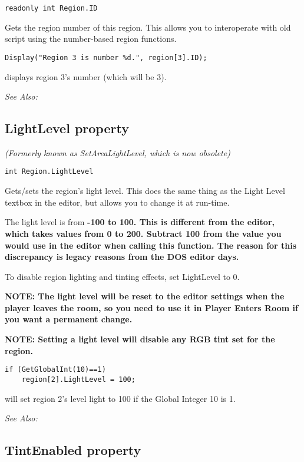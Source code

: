 \begin{verbatim}
readonly int Region.ID
\end{verbatim}
Gets the region number of this region. This allows you to interoperate with old
script using the number-based region functions.

\begin{verbatim}
Display("Region 3 is number %d.", region[3].ID);
\end{verbatim}
displays region 3's number (which will be 3).

\it{See Also:} 


\subsection{LightLevel property}\label{Region.LightLevel}%

\it{(Formerly known as SetAreaLightLevel, which is now obsolete)}

\begin{verbatim}
int Region.LightLevel
\end{verbatim}
Gets/sets the region's light level. This does the same thing as the Light Level
textbox in the editor, but allows you to change it at run-time.

The light level is from \bf{-100 to 100}. This is different from the editor, which
takes values from 0 to 200.
Subtract 100 from the value you would use in the editor when calling this function.
The reason for this discrepancy is legacy reasons from the DOS editor days.

To disable region lighting and tinting effects, set LightLevel to 0.

\bf{NOTE}: The light level will be reset to the editor settings when the player leaves the
room, so you need to use it in Player Enters Room if you want a permanent
change.

\bf{NOTE}: Setting a light level will disable any RGB tint set for the region.

\begin{verbatim}
if (GetGlobalInt(10)==1)
    region[2].LightLevel = 100;
\end{verbatim}
will set region 2's level light to 100 if the Global Integer 10 is 1.

\it{See Also:} 


\subsection{TintEnabled property}\label{Region.TintEnabled}%

